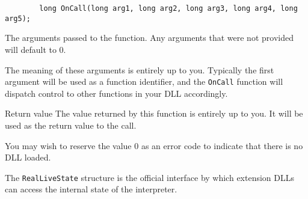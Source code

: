       \begin{lstlisting}
        long OnCall(long arg1, long arg2, long arg3, long arg4, long arg5);
      \end{lstlisting}
      \noindent
      \begin{nicelist}
      \item[\lstinline|arg1| .. \lstinline|arg5|]
        The arguments passed to the  function. Any arguments
        that were not provided will default to 0.
        
        The meaning of these arguments is entirely up to you. Typically the 
        first argument will be used as a function identifier, and the 
        \lstinline|OnCall| function will dispatch control to other functions in 
        your DLL accordingly.
      \item[Return value]
        The value returned by this function is entirely up to you.  It will
        be used as the return value to the  call.
        
        You may wish to reserve the value 0 as an error code to indicate that
        there is no DLL loaded.
      \end{nicelist}
      
    \label{sec:reallivestate}
      The \lstinline|RealLiveState| structure is the official interface by
      which extension DLLs can access the internal state of the interpreter.
      
